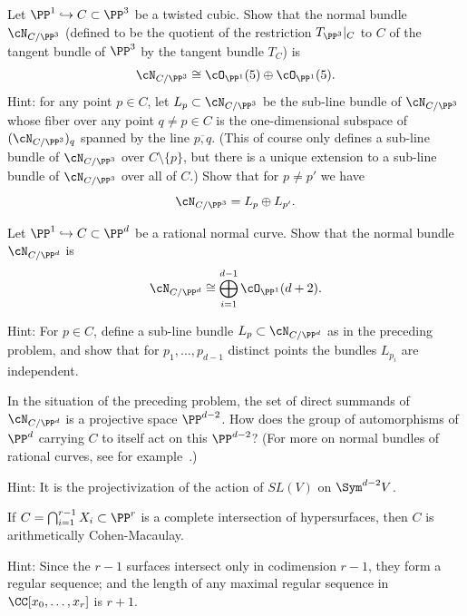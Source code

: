 
\begin{exercise}\label{Normal bundle of cubic}
Let $\PP^1 \hookrightarrow C \subset \PP^3$ be a twisted cubic. Show that the normal bundle $\cN_{C/\PP^3}$ (defined to be the quotient of the restriction $T_{\PP^3}|_C$ to $C$ of the tangent bundle  of $\PP^3$  by the tangent bundle $T_C$) is 
$$
\cN_{C/\PP^3} \cong \cO_{\PP^1}(5) \oplus  \cO_{\PP^1}(5).
$$
Hint: for any point $p \in C$, let $L_p \subset \cN_{C/\PP^3}$ be the sub-line bundle of $\cN_{C/\PP^3}$ whose fiber over any point $q \neq p \in C$ is the one-dimensional subspace of $(\cN_{C/\PP^3})_q$ spanned by the line $\overline{p,q}$. (This of course only defines a sub-line bundle of $\cN_{C/\PP^3}$ over $C \setminus \{p\}$, but there is a unique extension to a sub-line bundle of $\cN_{C/\PP^3}$ over all of $C$.) Show that for $p \neq p'$ we have
$$
\cN_{C/\PP^3} = L_p \oplus L_{p'}.
$$
\end{exercise}

\begin{exercise}
Let $\PP^1 \hookrightarrow C \subset \PP^d$ be a rational normal curve. Show that the normal bundle $\cN_{C/\PP^d}$  is 
$$
\cN_{C/\PP^d} \cong \bigoplus_{i=1}^{d-1} \cO_{\PP^1}(d+2).
$$

Hint: For $p \in C$, define a sub-line bundle $L_p \subset \cN_{C/\PP^d}$ as in the preceding problem, and show that for $p_1,\dots,p_{d-1}$ distinct points the bundles $L_{p_i}$ are independent.

\end{exercise}

\begin{exercise}
In the situation of the preceding problem, the set  of direct summands of $\cN_{C/\PP^d} $ is a projective space $\PP^{d-2}$. How does the  group of automorphisms of $\PP^d$ carrying $C$ to itself act on this $\PP^{d-2}$?
(For more on normal bundles of rational curves, see for example~\cite{MR3778979}.)

Hint: It is the projectivization of the action of $SL(V)$ on $\Sym^{d-2}V$.
\end{exercise}

\begin{exercise}\label{ci is acm}
If $C=\bigcap_{i = 1}^{r-1}X_i \subset \PP^r$ is a complete intersection of hypersurfaces,
then $C$ is arithmetically Cohen-Macaulay.

Hint: Since the $r-1$ surfaces intersect only in codimension $r-1$, they form
a regular sequence; and the length of any maximal regular sequence in 
$\CC[x_0,\dots, x_r]$ is $r+1$. \end{exercise}





